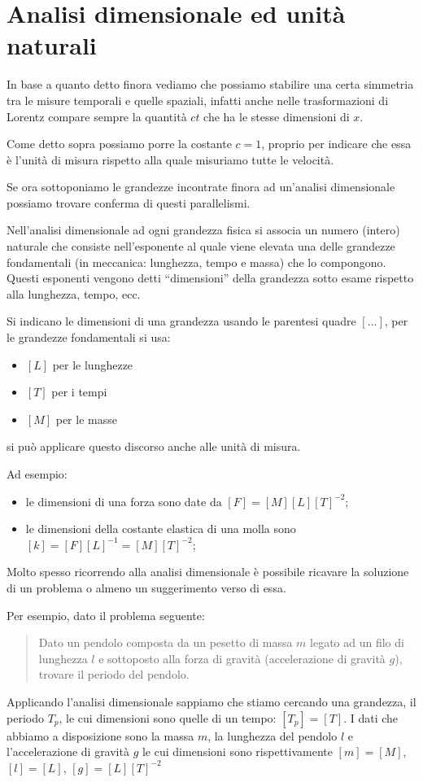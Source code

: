 \section{Analisi dimensionale ed unità naturali}\label{analisi-dimensionale-unita-naturali}
In base a quanto detto finora vediamo che possiamo stabilire una certa simmetria tra le misure 
temporali e quelle spaziali, infatti anche nelle trasformazioni di Lorentz compare sempre la quantità
$ct$ che ha le stesse dimensioni di $x$.

Come detto sopra possiamo porre la costante $c=1$, proprio per indicare che essa è l'unità di misura rispetto alla
quale misuriamo tutte le velocità.

Se ora sottoponiamo le grandezze incontrate finora ad un'analisi dimensionale possiamo trovare conferma di questi
parallelismi.

Nell'analisi dimensionale ad ogni grandezza fisica si associa un numero (intero) naturale che consiste nell'esponente
al quale viene elevata una delle grandezze fondamentali (in meccanica: lunghezza, tempo e massa) che lo compongono.
Questi esponenti vengono detti ``dimensioni'' della grandezza sotto esame rispetto alla lunghezza, tempo, ecc.

Si indicano le dimensioni di una grandezza usando le parentesi quadre $[...]$, per le grandezze fondamentali si usa:
\begin{itemize}
 \item $[L]$ per le lunghezze
 \item $[T]$ per i tempi
 \item $[M]$ per le masse
\end{itemize}
si può applicare questo discorso anche alle unità di misura.

Ad esempio:
\begin{itemize}
 \item le dimensioni di una forza sono date da $[F] = [M][L][T]^{-2}$;
 \item le dimensioni della costante elastica di una molla sono $[k] = [F][L]^{-1} = [M][T]^{-2}$;
\end{itemize}

Molto spesso ricorrendo alla analisi dimensionale è possibile ricavare la soluzione di un problema o almeno un suggerimento verso di essa.

Per esempio, dato il problema seguente:
\begin{quotation}
 Dato un pendolo composta da un pesetto di massa $m$ legato ad un filo di lunghezza $l$ e sottoposto alla forza di gravità 
(accelerazione di gravità $g$), trovare il periodo del pendolo.
\end{quotation}
Applicando l'analisi dimensionale sappiamo che stiamo cercando una grandezza, il periodo $T_p$, le cui dimensioni sono quelle di 
un tempo: $[T_p] = [T]$.
I dati che abbiamo a disposizione sono la massa $m$, la lunghezza del pendolo $l$ e l'accelerazione di gravità $g$ le cui dimensioni
sono rispettivamente $[m]=[M]$, $[l] = [L]$, $[g] = [L][T]^{-2}$

